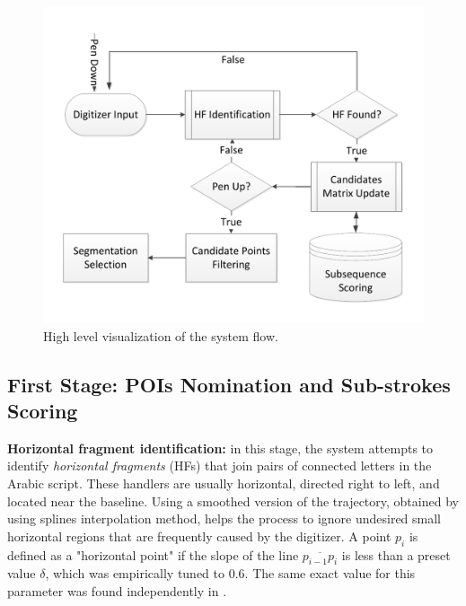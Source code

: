 \documentclass[10pt, conference, compsocconf]{IEEEtran}
\begin{document}
\begin{figure}
\centering
\includegraphics[width=1\columnwidth]{./figures/system_flow}
\caption{High level visualization of the system flow.}
\label{fig:system_flow}
\end{figure}

\subsection{First Stage: POIs Nomination and Sub-strokes Scoring}

\textbf{Horizontal fragment identification:} in this stage, the system attempts to identify \emph{horizontal fragments} (HFs) that join pairs of connected letters in the Arabic script. 
These handlers are usually horizontal, directed right to left, and located near the baseline. 
Using a smoothed version of the trajectory, obtained by using splines interpolation method, helps the process to ignore undesired small horizontal regions that are frequently caused by the digitizer.  
A point $p_{i}$ is defined as a "horizontal point" if the slope of the line $\overline{p_{i-1}p_{i}}$ is less than a preset value $\delta$, which was empirically tuned to $0.6$. 
The same exact value for this parameter was found independently in \cite{daifallah2009recognition}.

\end{document}
